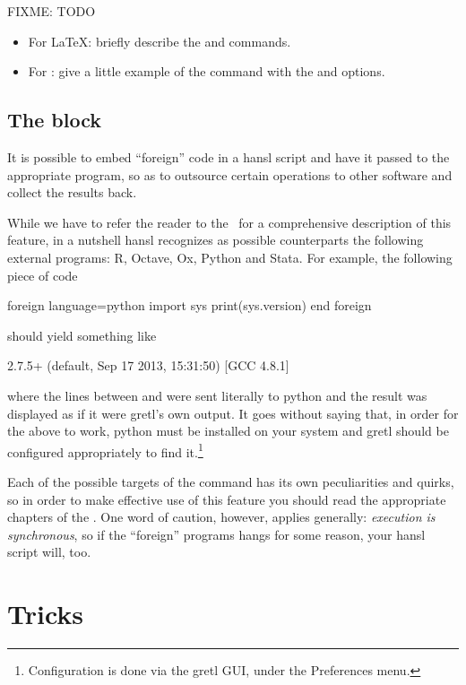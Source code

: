 FIXME: TODO

\begin{itemize}
\item For \LaTeX: briefly describe the  and
   commands.
\item For : give a little example of the 
  command with the  and  options.
\end{itemize}

\section{The  block}

It is possible to embed ``foreign'' code in a hansl script and have it
passed to the appropriate program, so as to outsource certain
operations to other software and collect the results back.

While we have to refer the reader to the \GUG\ for a comprehensive
description of this feature, in a nutshell hansl recognizes as
possible counterparts the following external programs: \textsf{R},
\textsf{Octave}, \textsf{Ox}, \textsf{Python} and \textsf{Stata}.  For
example, the following piece of code
\begin{code}
foreign language=python
	import sys
	print(sys.version)
end foreign
\end{code}
should yield something like
\begin{code}
2.7.5+ (default, Sep 17 2013, 15:31:50) 
[GCC 4.8.1]
\end{code}
where the lines between  and  were sent
literally to \textsf{python} and the result was displayed as if it
were gretl's own output. It goes without saying that, in order for the
above to work, \textsf{python} must be installed on your system and
gretl should be configured appropriately to find
it.\footnote{Configuration is done via the gretl GUI, under the
\textsf{Preferences} menu.}

Each of the possible targets of the  command has its own
peculiarities and quirks, so in order to make effective use of this
feature you should read the appropriate chapters of the \GUG. One word
of caution, however, applies generally: \emph{execution is
  synchronous}, so if the ``foreign'' programs hangs for some reason,
your hansl script will, too.

\chapter{Tricks}

